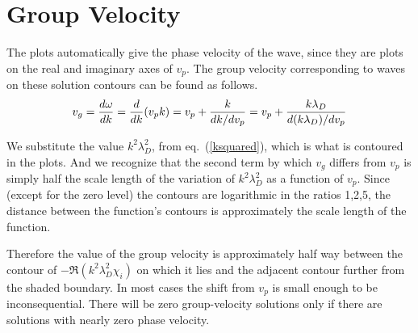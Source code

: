 \documentclass[12pt]{article}
\begin{document}
\appendix
\section{Group Velocity}

The plots automatically give the phase velocity of the wave, since
they are plots on the real and imaginary axes of $v_p$. The group
velocity corresponding to waves on these solution contours can be
found as follows.
\begin{equation}
  \label{vgroup}
  v_g = {d\omega\over dk} = {d\over dk}(v_p k) = v_p + {k\over
    dk/dv_p} = v_p + {k\lambda_{D}\over d(k\lambda_{D})/dv_p}
\end{equation}

We substitute the value $k^2\lambda_{D}^2$, from eq.\
(\ref{ksquared}), which is what is contoured in the plots. And we
recognize that the second term by which $v_g$ differs from $v_p$ is
simply half the scale length of the variation of $k^2\lambda_{D}^2$ as
a function of $v_p$. Since (except for the zero level) the contours
are logarithmic in the ratios 1,2,5, the distance between the
function's contours is approximately the scale length of the function.


Therefore the value of the group velocity is approximately half way
between the contour of $-\Re (k^2\lambda_{D}^2 \chi_i)$ on which
it lies and the adjacent contour further from the shaded boundary. In
most cases the shift from $v_p$ is small enough to be inconsequential.
There will be zero group-velocity solutions only if there are
solutions with nearly zero phase velocity.
\end{document}

